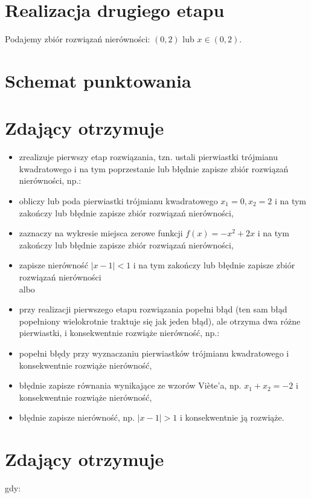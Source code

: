 \documentclass[10pt]{article}
\begin{document}
\section*{Realizacja drugiego etapu}
Podajemy zbiór rozwiązań nierówności: $(0,2)$ lub $x \in(0,2)$.

\section*{Schemat punktowania}
\section*{Zdający otrzymuje}
\begin{itemize}
  \item zrealizuje pierwszy etap rozwiązania, tzn. ustali pierwiastki trójmianu kwadratowego i na tym poprzestanie lub błędnie zapisze zbiór rozwiązań nierówności, np.:
  \item obliczy lub poda pierwiastki trójmianu kwadratowego $x_{1}=0, x_{2}=2$ i na tym zakończy lub błędnie zapisze zbiór rozwiązań nierówności,
  \item zaznaczy na wykresie miejsca zerowe funkcji $f(x)=-x^{2}+2 x$ i na tym zakończy lub błędnie zapisze zbiór rozwiązań nierówności,
  \item zapisze nierówność $|x-1|<1$ i na tym zakończy lub błędnie zapisze zbiór rozwiązań nierówności\\
albo
  \item przy realizacji pierwszego etapu rozwiązania popełni błąd (ten sam błąd popełniony wielokrotnie traktuje się jak jeden błąd), ale otrzyma dwa różne pierwiastki, i konsekwentnie rozwiąże nierówność, np.:
  \item popełni błędy przy wyznaczaniu pierwiastków trójmianu kwadratowego i konsekwentnie rozwiąże nierówność,
  \item błędnie zapisze równania wynikające ze wzorów Viète’a, np. $x_{1}+x_{2}=-2$ i konsekwentnie rozwiąże nierówność,
  \item błędnie zapisze nierówność, np. $|x-1|>1$ i konsekwentnie ją rozwiąże.
\end{itemize}

\section*{Zdający otrzymuje}
gdy:
\end{document}
